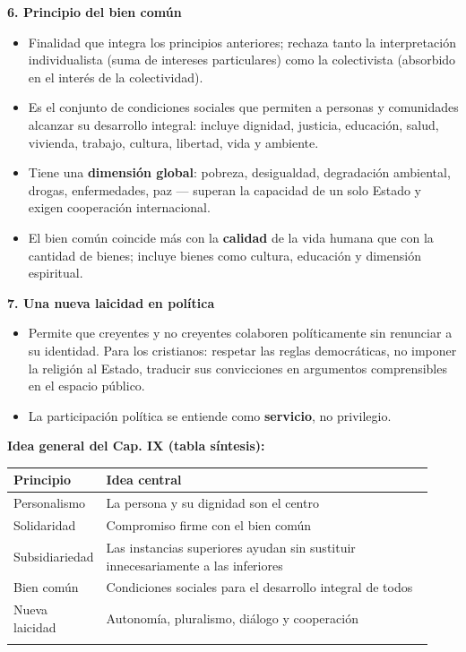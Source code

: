 \documentclass[10pt,a4paper]{article}
\begin{document}
\medskip\noindent \textbf{6. Principio del bien común}\par\nopagebreak
\begin{itemize}
\item Finalidad que integra los principios anteriores; rechaza tanto la interpretación individualista (suma de intereses particulares) como la colectivista (absorbido en el interés de la colectividad).
\item Es el conjunto de condiciones sociales que permiten a personas y comunidades alcanzar su desarrollo integral: incluye dignidad, justicia, educación, salud, vivienda, trabajo, cultura, libertad, vida y ambiente.
\item Tiene una \textbf{dimensión global}: pobreza, desigualdad, degradación ambiental, drogas, enfermedades, paz --- superan la capacidad de un solo Estado y exigen cooperación internacional.
\item El bien común coincide más con la \textbf{calidad} de la vida humana que con la cantidad de bienes; incluye bienes como cultura, educación y dimensión espiritual.
\end{itemize}

\medskip\noindent \textbf{7. Una nueva laicidad en política}\par\nopagebreak
\begin{itemize}
\item Permite que creyentes y no creyentes colaboren políticamente sin renunciar a su identidad. Para los cristianos: respetar las reglas democráticas, no imponer la religión al Estado, traducir sus convicciones en argumentos comprensibles en el espacio público.
\item La participación política se entiende como \textbf{servicio}, no privilegio.
\end{itemize}

\medskip\noindent \textbf{Idea general del Cap. IX (tabla síntesis):}\par\nopagebreak

{\small\renewcommand{\arraystretch}{1.25}
\begin{longtable}{>{\raggedright\arraybackslash}p{0.142\linewidth}>{\raggedright\arraybackslash}p{0.788\linewidth}}
\toprule
\textbf{Principio} & \textbf{Idea central} \\ \midrule \endhead
Personalismo & La persona y su dignidad son el centro \\ \addlinespace[2pt]
Solidaridad & Compromiso firme con el bien común \\ \addlinespace[2pt]
Subsidiariedad & Las instancias superiores ayudan sin sustituir innecesariamente a las inferiores \\ \addlinespace[2pt]
Bien común & Condiciones sociales para el desarrollo integral de todos \\ \addlinespace[2pt]
Nueva laicidad & Autonomía, pluralismo, diálogo y cooperación \\ \addlinespace[2pt]
\bottomrule\end{longtable}}
\end{document}
